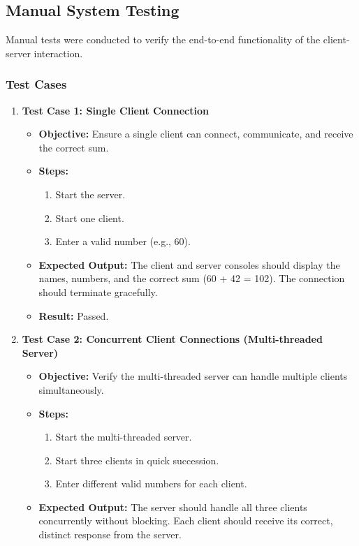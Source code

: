 \documentclass{article}
\begin{document}
\subsection{Manual System Testing}
Manual tests were conducted to verify the end-to-end functionality of the client-server interaction.

\subsubsection{Test Cases}
\begin{enumerate}
    \item \textbf{Test Case 1: Single Client Connection}
    \begin{itemize}
        \item \textbf{Objective:} Ensure a single client can connect, communicate, and receive the correct sum.
        \item \textbf{Steps:}
            \begin{enumerate}
                \item Start the server.
                \item Start one client.
                \item Enter a valid number (e.g., 60).
            \end{enumerate}
        \item \textbf{Expected Output:} The client and server consoles should display the names, numbers, and the correct sum (60 + 42 = 102). The connection should terminate gracefully.
        \item \textbf{Result:} Passed.
    \end{itemize}
    \item \textbf{Test Case 2: Concurrent Client Connections (Multi-threaded Server)}
    \begin{itemize}
        \item \textbf{Objective:} Verify the multi-threaded server can handle multiple clients simultaneously.
        \item \textbf{Steps:}
            \begin{enumerate}
                \item Start the multi-threaded server.
                \item Start three clients in quick succession.
                \item Enter different valid numbers for each client.
            \end{enumerate}
        \item \textbf{Expected Output:} The server should handle all three clients concurrently without blocking. Each client should receive its correct, distinct response from the server.

\end{itemize}
\end{enumerate}
\end{document}
